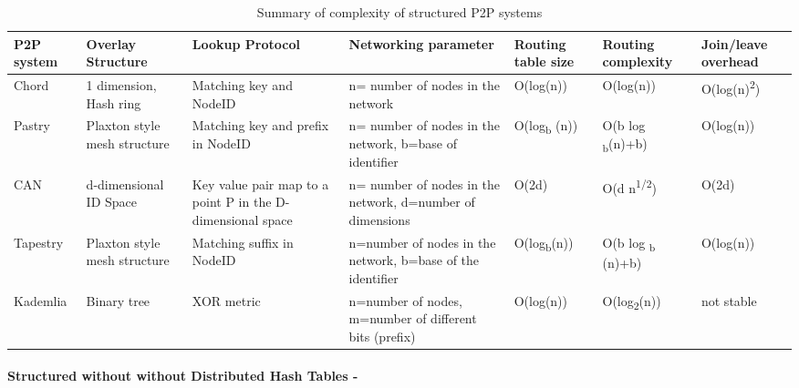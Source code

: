 \documentclass{./llncs2e/llncs}
\begin{document}
\begin{table}
  \begin{tabular}{| p{1.3cm} | p{1.6cm} | p{1.9cm} | p{1.8cm} | p{1.6cm} | p{1.8cm} | p{1.8cm} |}
    \hline                        
    \textbf{P2P system} & \textbf{Overlay Structure} & \textbf{Lookup Protocol} & \textbf{Networking parameter} & \textbf{Routing table size} & \textbf{Routing complexity} & \textbf{Join/leave overhead} \\
    
    \hline
    Chord & 1 dimension, Hash ring & Matching key and NodeID & n= number of nodes in the network & O(log(n)) & O(log(n)) & O(log(n)\textsuperscript{2}) \\
    
    \hline
    Pastry & Plaxton style mesh structure & Matching key and prefix in NodeID & n= number of nodes in the network, b=base of identifier & O(log\textsubscript{b} (n)) & O(b log \textsubscript{b}(n)+b) & O(log(n)) \\
    
    \hline
    CAN & d-dimensional ID Space & Key value pair map to a point P in the D-dimensional space & n= number of nodes in the network, d=number of dimensions & O(2d) & O(d n\textsuperscript{1/2}) & O(2d) \\
    
    \hline
    Tapestry & Plaxton style mesh structure & Matching suffix in NodeID & n=number of nodes in the network, b=base of the identifier & O(log\textsubscript{b}(n)) & O(b log \textsubscript{b} (n)+b) & O(log(n)) \\
    
    \hline  
    Kademlia & Binary tree & XOR metric & n=number of nodes, m=number of different bits (prefix) & O(log(n)) & O(log\textsubscript{2}(n)) & not stable \\
    \hline      
  \end{tabular}
  \caption{Summary of complexity of structured P2P systems}
  \label{table:Complexity of structured P2P systems using a DHT}
\end{table}


\paragraph{\textbf{Structured without without Distributed Hash Tables -}} %
\label{par:Structured without Non-Distributed Hash Tables}
\end{document}
